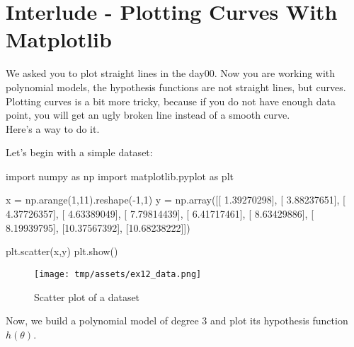 \documentclass[]{article}
\newenvironment{Shaded}{\begin{snugshade}}{\end{snugshade}}
\newcommand{\DecValTok}[1]{\textcolor[rgb]{0.96,0.45,0.00}{#1}}
\newcommand{\FloatTok}[1]{\textcolor[rgb]{0.96,0.45,0.00}{#1}}
\newcommand{\ImportTok}[1]{\textcolor[rgb]{0.15,0.68,0.38}{#1}}
\newcommand{\NormalTok}[1]{\textcolor[rgb]{0.81,0.81,0.76}{#1}}
\newcommand{\OperatorTok}[1]{\textcolor[rgb]{0.81,0.81,0.76}{#1}}
\begin{document}
\clearpage

\hypertarget{interlude---plotting-curves-with-matplotlib-1}{%
\section{Interlude - Plotting Curves With
Matplotlib}\label{interlude---plotting-curves-with-matplotlib-1}}

We asked you to plot straight lines in the day00. Now you are working
with polynomial models, the hypothesis functions are not straight lines,
but curves.\\
Plotting curves is a bit more tricky, because if you do not have enough
data point, you will get an ugly broken line instead of a smooth
curve.\\
Here's a way to do it.

Let's begin with a simple dataset:

\begin{Shaded}
\begin{Highlighting}[]
\ImportTok{import}\NormalTok{ numpy }\ImportTok{as}\NormalTok{ np}
\ImportTok{import}\NormalTok{ matplotlib.pyplot }\ImportTok{as}\NormalTok{ plt}

\NormalTok{x }\OperatorTok{=}\NormalTok{ np.arange(}\DecValTok{1}\NormalTok{,}\DecValTok{11}\NormalTok{).reshape(}\OperatorTok{-}\DecValTok{1}\NormalTok{,}\DecValTok{1}\NormalTok{)}
\NormalTok{y }\OperatorTok{=}\NormalTok{ np.array([[ }\FloatTok{1.39270298}\NormalTok{],}
\NormalTok{           [ }\FloatTok{3.88237651}\NormalTok{],}
\NormalTok{           [ }\FloatTok{4.37726357}\NormalTok{],}
\NormalTok{           [ }\FloatTok{4.63389049}\NormalTok{],}
\NormalTok{           [ }\FloatTok{7.79814439}\NormalTok{],}
\NormalTok{           [ }\FloatTok{6.41717461}\NormalTok{],}
\NormalTok{           [ }\FloatTok{8.63429886}\NormalTok{],}
\NormalTok{           [ }\FloatTok{8.19939795}\NormalTok{],}
\NormalTok{           [}\FloatTok{10.37567392}\NormalTok{],}
\NormalTok{           [}\FloatTok{10.68238222}\NormalTok{]])}

\NormalTok{plt.scatter(x,y)}
\NormalTok{plt.show()}
\end{Highlighting}
\end{Shaded}

\begin{figure}
\centering
\texttt{[image: tmp/assets/ex12\_data.png]}
\caption{Scatter plot of a dataset}
\end{figure}

Now, we build a polynomial model of degree 3 and plot its hypothesis
function \(h(\theta)\).
\end{document}
